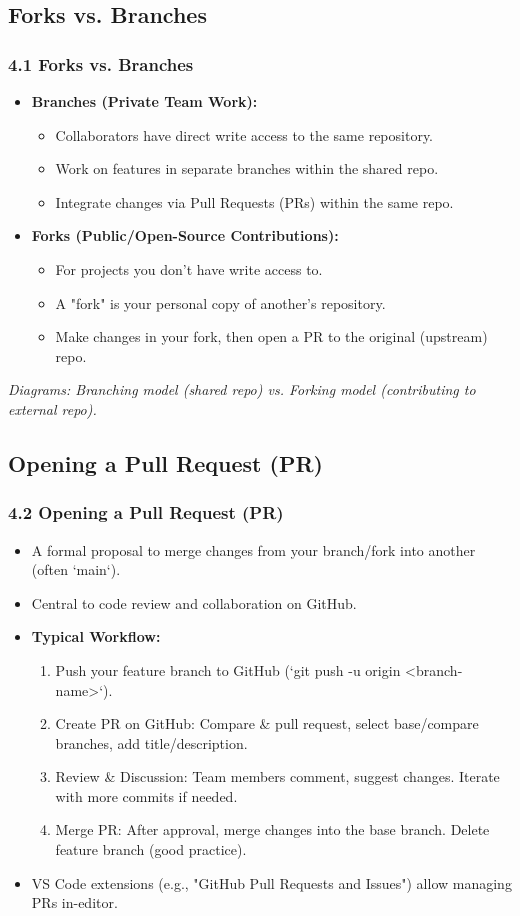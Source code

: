 \documentclass{beamer}
\begin{document}
\subsection{Forks vs. Branches}
\begin{frame}
  \frametitle{4.1 Forks vs. Branches}
  \begin{itemize}
    \item \textbf{Branches (Private Team Work):}
    \begin{itemize}
        \item Collaborators have direct write access to the same repository.
        \item Work on features in separate branches within the shared repo.
        \item Integrate changes via Pull Requests (PRs) within the same repo.
    \end{itemize}
    \item \textbf{Forks (Public/Open-Source Contributions):}
    \begin{itemize}
        \item For projects you don't have write access to.
        \item A "fork" is your personal copy of another's repository.
        \item Make changes in your fork, then open a PR to the original (upstream) repo.
    \end{itemize}
  \end{itemize}
  \vfill
  \textit{Diagrams: Branching model (shared repo) vs. Forking model (contributing to external repo).}
\end{frame}

\subsection{Opening a Pull Request (PR)}
\begin{frame}
  \frametitle{4.2 Opening a Pull Request (PR)}
  \begin{itemize}
    \item A formal proposal to merge changes from your branch/fork into another (often `main`).
    \item Central to code review and collaboration on GitHub.
    \item \textbf{Typical Workflow:}
    \begin{enumerate}
        \item Push your feature branch to GitHub (`git push -u origin <branch-name>`).
        \item Create PR on GitHub: Compare \& pull request, select base/compare branches, add title/description.
        \item Review \& Discussion: Team members comment, suggest changes. Iterate with more commits if needed.
        \item Merge PR: After approval, merge changes into the base branch. Delete feature branch (good practice).
    \end{enumerate}
    \item VS Code extensions (e.g., "GitHub Pull Requests and Issues") allow managing PRs in-editor.
  \end{itemize}
\end{frame}
\end{document}

